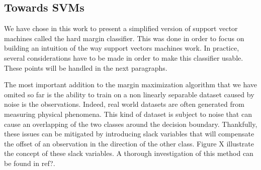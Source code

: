 \subsection{Towards SVMs}

We have chose in this work to present a simplified version of support vector machines called the hard margin classifier. This was done in order to focus on building an intuition of the way support vectors machines work. In practice, several considerations have to be made in order to make this classifier usable. These points will be handled in the next paragraphs.

The most important addition to the margin maximization algorithm that we have omited so far is the ability to train on a non linearly separable dataset caused by noise is the observations. Indeed, real world datasets are often generated from measuring physical phenomena. This kind of dataset is subject to noise that can cause an overlapping of the two classes around the decision boundary. Thankfully, these issues can be mitigated by introducing slack variables that will compensate the offset of an observation in the direction of the other class. Figure X illustrate the concept of these slack variables. A thorough investigation of this method can be found in  \textcolor[rgb]{1,0,0}{ref?}.

